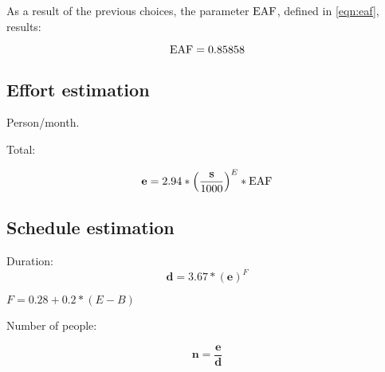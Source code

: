As a result of the previous choices, the parameter $ \text{EAF} $, defined in \cref{eqn:eaf}, results:

\begin{equation}
	\text{EAF} = 0.85858	
\end{equation}





\subsection*{Effort estimation}

Person/month.

Total:

\begin{equation}
%
	\mEffort = 2.94 * { \left( \frac{\mSize}{1000} \right) }^{E} * \eaf
%
\end{equation}









\subsection{Schedule estimation}

Duration:\begin{equation}%
%
\mathbf{d} = 3.67 * {\left(\mathbf{e}\right)}^F
%
\end{equation}

$ F = 0.28 + 0.2 * \left( E - B \right) $


Number of people:

\begin{equation}
\mathbf{n} = \frac{\mathbf{e}}{\mathbf{d}}
\end{equation}











